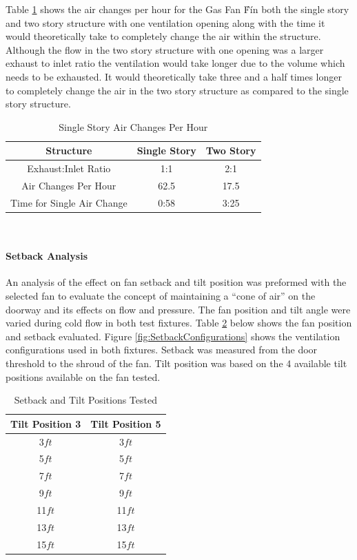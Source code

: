 \documentclass{article}
\begin{document}
Table \ref{table:airchanges} shows the air changes per hour for the Gas Fan \'F\' in both the single story and two story structure with one ventilation opening along with the time it would theoretically take to completely change the air within the structure. Although the flow in the two story structure with one opening was a larger exhaust to inlet ratio the ventilation would take longer due to the volume which needs to be exhausted. It would theoretically take three and a half times longer to completely change the air in the two story structure as compared to the single story structure. 

\begin{table}[H]
	\centering
	\caption{Single Story Air Changes Per Hour}
	\begin{tabular}{|c|c|c|}
		\hline
		Structure & Single Story & Two  Story \\ \hline \hline
		Exhaust:Inlet Ratio & 1:1 & 2:1 \\ \hline \hline
		Air Changes Per Hour & 62.5 & 17.5 \\ \hline
		Time for Single Air Change & 0:58 & 3:25  \\ \hline
	\end{tabular}
	\label{table:airchanges}
\end{table}\

\paragraph{Setback Analysis} \mbox{}

An analysis of the effect on fan setback and tilt position was preformed with the selected fan to evaluate the concept of maintaining a ``cone of air'' on the doorway and its effects on flow and pressure. The fan position and tilt angle were varied during cold flow in both test fixtures. Table \ref{table:SetbackPositions} below shows the fan position and setback evaluated. Figure \ref{fig:SetbackConfigurations} shows the ventilation configurations used in both fixtures. Setback was measured from the door threshold to the shroud of the fan. Tilt position was based on the 4 available tilt positions available on the fan tested. 

\begin{table}[H]
	\caption{Setback and Tilt Positions Tested}
	\centering
	\begin{tabular}{|c|c|}
		\hline
		\textbf{Tilt Position 3} & \textbf{Tilt Position 5} \\ \hline \hline
		3$ft$ & 3$ft$ \\ \hline
		5$ft$ & 5$ft$ \\ \hline
		7$ft$ & 7$ft$ \\ \hline
		9$ft$ & 9$ft$ \\ \hline
		11$ft$ & 11$ft$ \\ \hline
		13$ft$ & 13$ft$ \\ \hline
		15$ft$ & 15$ft$ \\ \hline	
	\end{tabular}
	\label{table:SetbackPositions}
\end{table}
\end{document}
